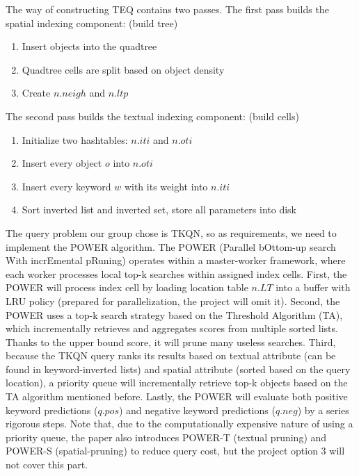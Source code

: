 \documentclass[]{IEEEphot}
\begin{document}
The way of constructing TEQ contains two passes. The first pass builds the spatial indexing component: (build tree)

\begin{enumerate}
    \item Insert objects into the quadtree
    \item Quadtree cells are split based on object density
    \item Create $n.neigh$ and $n.ltp$
\end{enumerate}

The second pass builds the textual indexing component: (build cells)

\begin{enumerate}
    \item Initialize two hashtables: $n.iti$ and $n.oti$
    \item Insert every object $o$ into $n.oti$
    \item Insert every keyword $w$ with its weight into $n.iti$
    \item Sort inverted list and inverted set, store all parameters into disk
\end{enumerate}

The query problem our group chose is TKQN, so as requirements, we need to implement the POWER algorithm. The POWER (Parallel bOttom-up search With incrEmental pRuning) operates within a master-worker framework, where each worker processes local top-k searches within assigned index cells. First, the POWER will process index cell by loading location table $n.LT$ into a buffer with LRU policy (prepared for parallelization, the project will omit it). Second, the POWER uses a top-k search strategy based on the Threshold Algorithm (TA), which incrementally retrieves and aggregates scores from multiple sorted lists. Thanks to the upper bound score, it will prune many useless searches. Third, because the TKQN query ranks its results based on textual attribute (can be found in keyword-inverted lists) and spatial attribute (sorted based on the query location), a priority queue will incrementally retrieve top-k objects based on the TA algorithm mentioned before. Lastly, the POWER will evaluate both positive keyword predictions ($q.pos$) and negative keyword predictions ($q.neg$) by a series rigorous steps. Note that, due to the computationally expensive nature of using a priority queue, the paper also introduces POWER-T (textual pruning) and POWER-S (spatial-pruning) to reduce query cost, but the project option 3 will not cover this part.
\end{document}

